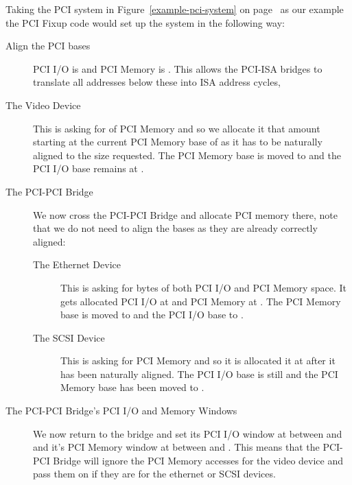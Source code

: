 Taking the PCI system in Figure~\ref{example-pci-system} on
page~\pageref{example-pci-system} as our example the
PCI Fixup code would set up the system in the following way:
\begin{description}
	\item [Align the PCI bases] PCI I/O is  and
		PCI Memory is .  This allows the PCI-ISA bridges
		to translate all addresses below these into ISA address cycles,
	\item [The Video Device] This is asking for
		 of PCI Memory and so we allocate it that	
		amount starting at the current PCI Memory base of 
		 as it has to be naturally aligned to 
		the size requested.  
		The PCI Memory base is moved to 
		 and the PCI I/O base remains at .
	\item [The PCI-PCI Bridge] We now cross the PCI-PCI Bridge and
		allocate PCI memory there, note that we do not need to 
		align the bases as they are already correctly aligned:
	\begin{description}
		\item [The Ethernet Device] This is asking for  bytes
		of both PCI I/O and PCI Memory space.  It gets allocated PCI
		I/O at  and PCI Memory at .
		The PCI Memory base is moved to 
		 and the PCI I/O base to .
		\item [The SCSI Device] This is asking for  PCI Memory
		and so it is allocated it at  after it has been
		naturally aligned.  The PCI I/O  base is still  and
		the PCI Memory base has been moved to .
	\end{description}
	\item [The PCI-PCI Bridge's PCI I/O and Memory Windows] We now return to
		the bridge and set its PCI I/O window at between  and  and
		it's PCI Memory window at between  and .
		This means  that the PCI-PCI Bridge will ignore the PCI Memory accesses for
		the video device and pass them on if they are for the ethernet or SCSI
		devices.
\end{description}


